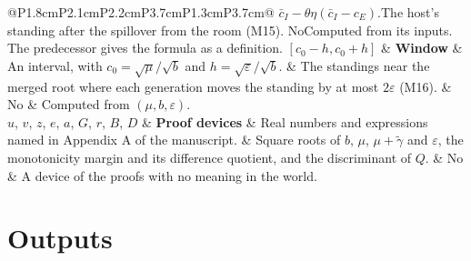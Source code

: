 \documentclass[11pt]{article}
\newcommand{\mm}[6]{#1 & \textbf{#2} & #3 & #4 & #5 & #6 \\ \addlinespace}
\begin{document}
\begin{longtable}{@{}P{1.8cm}P{2.1cm}P{2.2cm}P{3.7cm}P{1.3cm}P{3.7cm}@{}}
{  $\bar c_I-\theta\eta(\bar c_I-c_E)$.}{The host's standing after the
  spillover from the room (M15).}
  {No}{Computed from its inputs. The predecessor
  gives the formula as a definition.}
\mm{$[c_0-h,c_0+h]$}{Window}{An interval, with $c_0=\sqrt\mu/\sqrt b$ and
  $h=\sqrt\varepsilon/\sqrt b$.}{The standings near the merged root where
  each generation moves the standing by at most $2\varepsilon$
  (M16).}
  {No}{Computed from $(\mu,b,\varepsilon)$.}
\mm{$u$, $v$, $z$, $e$, $a$, $G$, $r$, $B$, $D$}{Proof devices}{Real numbers and
  expressions named in Appendix A of the manuscript.}{Square roots of $b$,
  $\mu$, $\mu+\tilde\gamma$ and $\varepsilon$, the monotonicity margin and its difference
  quotient, and the discriminant of $Q$.}
  {No}{A device of the proofs with no
  meaning in the world.}
\end{longtable}
\normalsize

\section*{Outputs}
\end{document}
